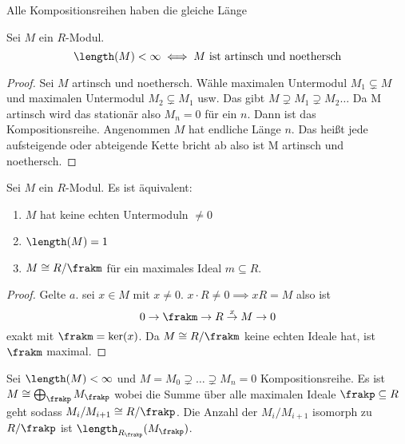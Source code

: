 \begin{Kor}
	Alle Kompositionsreihen haben die gleiche Länge
\end{Kor}
\begin{Satz}\label{Satz:EndlLenNoethArtin}
	Sei \(M\) ein \(R\)-Modul. 
	\[\length(M)<\infty\iff M\text{ ist artinsch und noethersch}\]
\end{Satz}
\begin{proof}
	Sei \(M\) artinsch und noethersch. Wähle maximalen Untermodul \(M_1\subsetneq M\) und maximalen Untermodul \(M_2\subsetneq M_1\) usw. Das gibt \(M\supsetneq M_1\supsetneq M_2\dots\) Da M artinsch wird das stationär also \(M_n=0\) für ein \(n\). Dann ist das Kompositionsreihe.
	Angenommen \(M\) hat endliche Länge \(n\). Das heißt jede aufsteigende oder abteigende Kette bricht ab also ist M artinsch und noethersch.
\end{proof}
\begin{Satz}
	Sei \(M\) ein \(R\)-Modul. Es ist äquivalent:
	\begin{enumerate}
		\item \(M\) hat keine echten Untermoduln \(\neq 0\)
		\item \(\length(M)=1\)
		\item \(M\cong R/\frakm\) für ein maximales Ideal \(m\subseteq R\).
	\end{enumerate}
\end{Satz}
\begin{proof}
	Gelte \(a\). sei \(x\in M\) mit \(x\neq 0\). \(x\cdot R\neq 0\implies xR=M\) also ist \[0\to \frakm\to R\stackrel x \to M\to 0\] exakt mit \(\frakm=\ker(x)\). Da \(M\cong R/\frakm\) keine echten Ideale hat, ist \(\frakm\) maximal.
\end{proof}
\begin{Satz}\label{Satz:StrukturModEndlLength}
	Sei \(\length(M)<\infty\) und \(M=M_0\supsetneq\dots\supsetneq M_n=0\) Kompositionsreihe. Es ist \(M\cong \bigoplus_\frakp M_\frakp\) wobei die Summe über alle maximalen Ideale \(\frakp\subseteq R\) geht sodass \(M_i/M_{i+1}\cong R/\frakp\).
	Die Anzahl der \(M_i/M_{i+1}\) isomorph zu \(R/\frakp\) ist \(\length_{R_\frakp}(M_\frakp)\).
\end{Satz}

